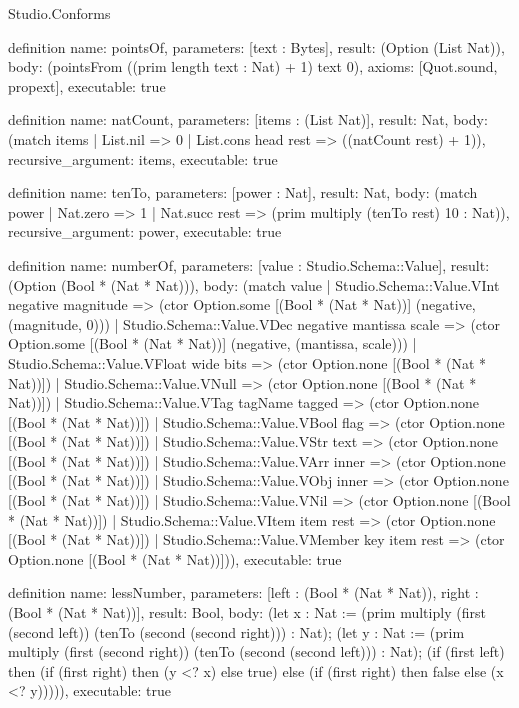 \begin{lexlean}{Studio.Conforms}
\begin{semanticmodule}
definition{
  name: pointsOf,
  parameters: [text : Bytes],
  result: (Option (List Nat)),
  body: (pointsFrom ((prim length text : Nat) + 1) text 0),
  axioms: [Quot.sound, propext],
  executable: true
}

definition{
  name: natCount,
  parameters: [items : (List Nat)],
  result: Nat,
  body: (match items
    | List.nil => 0
    | List.cons head rest => ((natCount rest) + 1)),
  recursive_argument: items,
  executable: true
}

definition{
  name: tenTo,
  parameters: [power : Nat],
  result: Nat,
  body: (match power
    | Nat.zero => 1
    | Nat.succ rest => (prim multiply (tenTo rest) 10 : Nat)),
  recursive_argument: power,
  executable: true
}

definition{
  name: numberOf,
  parameters: [value : Studio.Schema::Value],
  result: (Option (Bool * (Nat * Nat))),
  body: (match value
    | Studio.Schema::Value.VInt negative magnitude => (ctor Option.some [(Bool * (Nat * Nat))] (negative, (magnitude, 0)))
    | Studio.Schema::Value.VDec negative mantissa scale => (ctor Option.some [(Bool * (Nat * Nat))] (negative, (mantissa, scale)))
    | Studio.Schema::Value.VFloat wide bits => (ctor Option.none [(Bool * (Nat * Nat))])
    | Studio.Schema::Value.VNull => (ctor Option.none [(Bool * (Nat * Nat))])
    | Studio.Schema::Value.VTag tagName tagged => (ctor Option.none [(Bool * (Nat * Nat))])
    | Studio.Schema::Value.VBool flag => (ctor Option.none [(Bool * (Nat * Nat))])
    | Studio.Schema::Value.VStr text => (ctor Option.none [(Bool * (Nat * Nat))])
    | Studio.Schema::Value.VArr inner => (ctor Option.none [(Bool * (Nat * Nat))])
    | Studio.Schema::Value.VObj inner => (ctor Option.none [(Bool * (Nat * Nat))])
    | Studio.Schema::Value.VNil => (ctor Option.none [(Bool * (Nat * Nat))])
    | Studio.Schema::Value.VItem item rest => (ctor Option.none [(Bool * (Nat * Nat))])
    | Studio.Schema::Value.VMember key item rest => (ctor Option.none [(Bool * (Nat * Nat))])),
  executable: true
}

definition{
  name: lessNumber,
  parameters: [left : (Bool * (Nat * Nat)), right : (Bool * (Nat * Nat))],
  result: Bool,
  body: (let x : Nat := (prim multiply (first (second left)) (tenTo (second (second right))) : Nat); (let y : Nat := (prim multiply (first (second right)) (tenTo (second (second left))) : Nat); (if (first left) then (if (first right) then (y <? x) else true) else (if (first right) then false else (x <? y))))),
  executable: true
}


\end{semanticmodule}
\end{lexlean}
